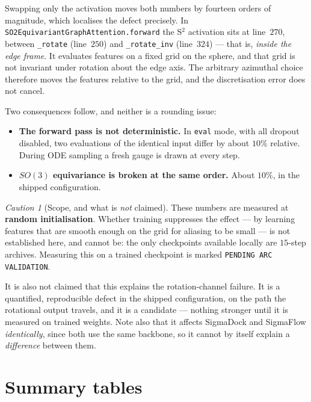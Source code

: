 \documentclass[11pt,a4paper]{report}
\theoremstyle{definition}
\theoremstyle{remark}
\newtheorem{caution}[caution]{Caution}
\newcommand{\pyfunc}[1]{\texttt{#1}}
\begin{document}
Swapping only the activation moves both numbers by fourteen orders of
magnitude, which localises the defect precisely. In
\pyfunc{SO2EquivariantGraphAttention.forward} the S$^2$ activation sits at
line~$270$, between \texttt{\_rotate} (line~$250$) and \texttt{\_rotate\_inv}
(line~$324$) --- that is, \emph{inside the edge frame}. It evaluates features
on a fixed grid on the sphere, and that grid is not invariant under rotation
about the edge axis. The arbitrary azimuthal choice therefore moves the
features relative to the grid, and the discretisation error does not cancel.

Two consequences follow, and neither is a rounding issue:
\begin{itemize}
\item \textbf{The forward pass is not deterministic.} In \pyfunc{eval} mode,
      with all dropout disabled, two evaluations of the identical input differ
      by about $10\%$ relative. During ODE sampling a fresh gauge is drawn at
      every step.
\item \textbf{$SO(3)$ equivariance is broken at the same order.} About $10\%$,
      in the shipped configuration.
\end{itemize}

\begin{caution}[Scope, and what is \emph{not} claimed]
\label{caution:s2-scope}
These numbers are measured at \textbf{random initialisation}. Whether
training suppresses the effect --- by learning features that are smooth enough
on the grid for aliasing to be small --- is not established here, and cannot
be: the only checkpoints available locally are $15$-step archives. Measuring
this on a trained checkpoint is marked \texttt{PENDING ARC VALIDATION}.

It is also not claimed that this explains the rotation-channel failure. It is
a quantified, reproducible defect in the shipped configuration, on the path
the rotational output travels, and it is a candidate --- nothing stronger
until it is measured on trained weights. Note also that it affects SigmaDock
and SigmaFlow \emph{identically}, since both use the same backbone, so it
cannot by itself explain a \emph{difference} between them.
\end{caution}

\section{Summary tables}
\label{sec:head-tables}
\end{document}
